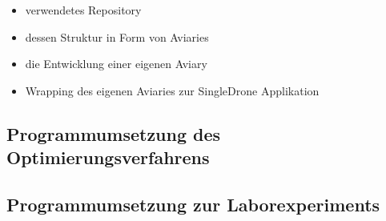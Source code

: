 \begin{itemize}
    \item verwendetes Repository
    \item dessen Struktur in Form von Aviaries
    \item die Entwicklung einer eigenen Aviary 
    \item Wrapping des eigenen Aviaries zur SingleDrone Applikation
\end{itemize}
\subsection{Programmumsetzung des Optimierungsverfahrens}
\subsection{Programmumsetzung zur Laborexperiments}
